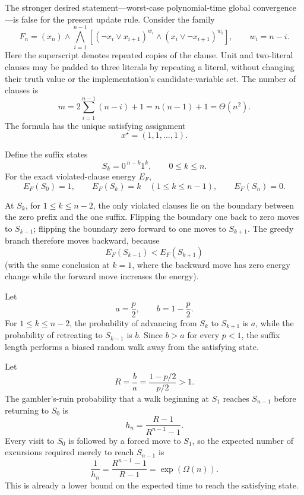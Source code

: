 The stronger desired statement---worst-case polynomial-time global
convergence---is false for the present update rule.  Consider the family
\begin{equation}
F_n
=
(x_n)
\land
\bigwedge_{i=1}^{n-1}
\left[
(\neg x_i\lor x_{i+1})^{w_i}
\land
(x_i\lor\neg x_{i+1})^{w_i}
\right],
\qquad
w_i=n-i.
\end{equation}
Here the superscript denotes repeated copies of the clause.  Unit and
two-literal clauses may be padded to three literals by repeating a literal,
without changing their truth value or the implementation's candidate-variable
set.  The number of clauses is
\begin{equation}
m
=
2\sum_{i=1}^{n-1}(n-i)+1
=
n(n-1)+1
=
\Theta(n^2).
\end{equation}
The formula has the unique satisfying assignment
\begin{equation}
x^\star=(1,1,\ldots,1).
\end{equation}

Define the suffix states
\begin{equation}
S_k
=
0^{\,n-k}1^k,
\qquad
0\le k\le n.
\end{equation}
For the exact violated-clause energy $E_F$,
\begin{equation}
E_F(S_0)=1,
\qquad
E_F(S_k)=k
\quad(1\le k\le n-1),
\qquad
E_F(S_n)=0.
\end{equation}

At $S_k$, for $1\le k\le n-2$, the only violated clauses lie on the
boundary between the zero prefix and the one suffix.  Flipping the boundary
one back to zero moves to $S_{k-1}$; flipping the boundary zero forward to one
moves to $S_{k+1}$.  The greedy branch therefore moves backward, because
\begin{equation}
E_F(S_{k-1}) < E_F(S_{k+1})
\end{equation}
(with the same conclusion at $k=1$, where the backward move has zero energy
change while the forward move increases the energy).

Let
\begin{equation}
a=\frac{p}{2},
\qquad
b=1-\frac{p}{2}.
\end{equation}
For $1\le k\le n-2$, the probability of advancing from $S_k$ to $S_{k+1}$
is $a$, while the probability of retreating to $S_{k-1}$ is $b$.  Since
$b>a$ for every $p<1$, the suffix length performs a biased random walk away
from the satisfying state.

Let
\begin{equation}
R=\frac{b}{a}
=
\frac{1-p/2}{p/2}>1.
\end{equation}
The gambler's-ruin probability that a walk beginning at $S_1$ reaches
$S_{n-1}$ before returning to $S_0$ is
\begin{equation}
h_n
=
\frac{R-1}{R^{n-1}-1}.
\end{equation}
Every visit to $S_0$ is followed by a forced move to $S_1$, so the expected
number of excursions required merely to reach $S_{n-1}$ is
\begin{equation}
\frac{1}{h_n}
=
\frac{R^{n-1}-1}{R-1}
=
\exp(\Omega(n)).
\end{equation}
This is already a lower bound on the expected time to reach the satisfying
state.

